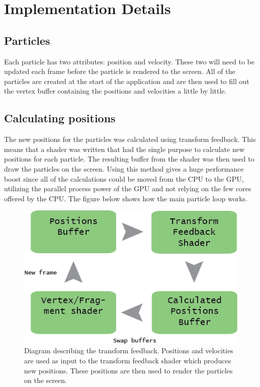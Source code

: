 \documentclass[report]{vgtc}
\begin{document}
	\section{Implementation Details}	
	
	\subsection{Particles}

Each particle has two attributes: position and velocity. These two will need to be updated each frame before the particle is rendered to the screen. All of the particles are created at the start of the application and are then used to fill out the vertex buffer containing the positions and velocities a little by little.


\subsection{Calculating positions}
The new positions for the particles was calculated using transform feedback. This means that a shader was written that had the single purpose to calculate new positions for each particle. The resulting buffer from the shader was then used to draw the particles on the screen. Using this method gives a huge performance boost since all of the calculations could be moved from the CPU to the GPU, utilizing the parallel process power of the GPU and not relying on the few cores offered by the CPU.  The figure below shows how the main particle loop works.
\begin{figure}[H]
\includegraphics[scale=0.47]{img/transform.png}
\caption{Diagram describing the transform feedback. Positions and velocities are used as input to the transform feedback shader which produces new positions. These positions are then used to render the particles on the screen. }
\end{figure}
\end{document}
